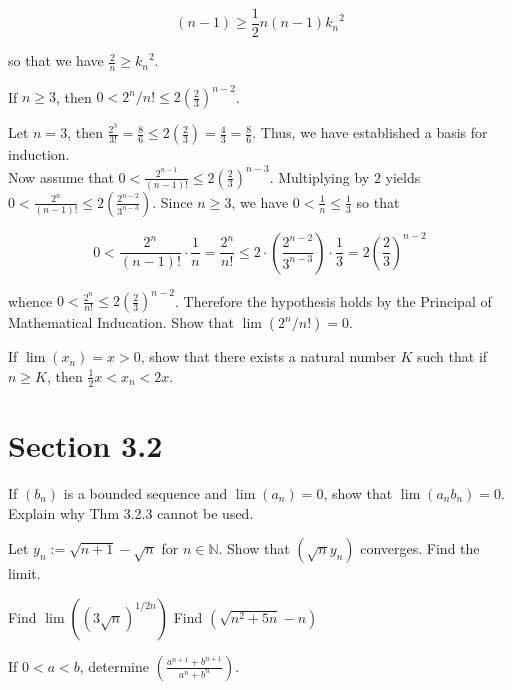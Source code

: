 \documentclass[paper=a4, fontsize=11pt]{scrartcl} %
\numberwithin{equation}{section} %
\numberwithin{figure}{section} %
\numberwithin{table}{section} %
\begin{document}
\begin{equation*}
(n - 1) \geq \frac{1}{2} n (n - 1) {k_n}^2
\end{equation*}

so that we have $\frac{2}{n} \geq {k_n}^2$.

 If $n \geq 3$, then $0 < 2^n/n! \leq 2(\frac{2}{3})^{n-2}$.

\pf Let $n = 3$, then $\frac{2^3}{3!} = \frac{8}{6} \leq 2(\frac{2}{3}) = \frac{4}{3} = \frac{8}{6}$. Thus, we have established a basis for induction.\\

Now assume that $0 < \frac{2^{n-1}}{(n-1)!} \leq 2\left(\frac{2}{3}\right)^{n-3}$. Multiplying by $2$ yields $ 0 < \frac{2^n}{(n-1)!} \leq 2\left(\frac{2^{n-2}}{3^{n-3}}\right)$. Since $n \geq 3$, we have $0 < \frac{1}{n} \leq \frac{1}{3}$ so that

\begin{equation*}
0 < \frac{2^n}{(n-1)!} \cdot \frac{1}{n} = \frac{2^n}{n!} \leq 2 \cdot \left(\frac{2^{n-2}}{3^{n-3}}\right) \cdot \frac{1}{3} = 2 \left( \frac{2}{3} \right)^{n-2} 
\end{equation*}

whence $0 < \frac{2^n}{n!} \leq 2\left(\frac{2}{3}\right)^{n-2}$. Therefore the hypothesis holds by the Principal of Mathematical Inducation. \done
{} Show that $\lim(2^n/n!) = 0$.

\pf

 If $\lim(x_n) = x > 0$, show that there exists a natural number $K$ such that if $n \geq K$, then $\frac{1}{2}x < x_n < 2x$.
\pf

\section*{Section 3.2}
 If $(b_n)$ is a bounded sequence and $\lim(a_n) = 0$, show that $\lim(a_n b_n) = 0$. Explain why Thm 3.2.3 cannot be used.
\pf

 Let $y_n := \sqrt{n+1} - \sqrt{n}$ for $n \in \mathbb{N}$. Show that $(\sqrt{n} y_n)$ converges. Find the limit.
\pf

 Find $\lim\left((3\sqrt{n})^{1/2n}\right)$
\pf
{} Find $(\sqrt{n^2 + 5n} - n)$
\pf

\newcommand{\anp}{a^{n+1}}
\newcommand{\bnp}{b^{n+1}}
 If $0 < a < b$, determine $\left(\frac{\anp + \bnp}{a^n + b^n}\right)$.
\pf
\end{document}
